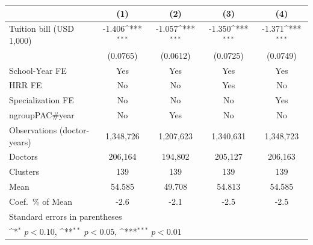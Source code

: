 {
\def\sym#1{\ifmmode^{#1}\else\(^{#1}\)\fi}
\begin{tabular}{l*{4}{c}}
\hline\hline
                    &\multicolumn{1}{c}{(1)}         &\multicolumn{1}{c}{(2)}         &\multicolumn{1}{c}{(3)}         &\multicolumn{1}{c}{(4)}         \\
\hline
Tuition bill (USD 1,000)&      -1.406\sym{***}&      -1.057\sym{***}&      -1.350\sym{***}&      -1.371\sym{***}\\
                    &    (0.0765)         &    (0.0612)         &    (0.0725)         &    (0.0749)         \\
[1em]
School-Year FE      &         Yes         &         Yes         &         Yes         &         Yes         \\
[1em]
HRR FE              &          No         &          No         &         Yes         &          No         \\
[1em]
Specialization FE   &          No         &          No         &          No         &         Yes         \\
[1em]
ngroupPAC#year      &          No         &         Yes         &          No         &          No         \\
\hline
Observations (doctor-years)&   1,348,726         &   1,207,623         &   1,340,631         &   1,348,723         \\
Doctors             &     206,164         &     194,802         &     205,127         &     206,163         \\
Clusters            &         139         &         139         &         139         &         139         \\
Mean                &      54.585         &      49.708         &      54.813         &      54.585         \\
Coef.\ \% of Mean   &        -2.6         &        -2.1         &        -2.5         &        -2.5         \\
\hline\hline
\multicolumn{5}{l}{\footnotesize Standard errors in parentheses}\\
\multicolumn{5}{l}{\footnotesize \sym{*} \(p<0.10\), \sym{**} \(p<0.05\), \sym{***} \(p<0.01\)}\\
\end{tabular}
}
